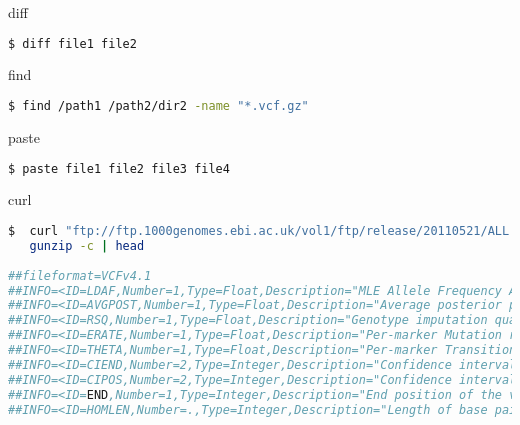\documentclass{beamer}
\begin{document}
\begin{frame}[fragile]
 \begin{center}
    \huge{diff}\\
    \end{center}
\begin{lstlisting}[language=bash]
$ diff file1 file2
\end{lstlisting}
\end{frame}

\begin{frame}[fragile]
 \begin{center}
    \huge{find}\\
    \end{center}
\begin{lstlisting}[language=bash]
$ find /path1 /path2/dir2 -name "*.vcf.gz"
\end{lstlisting}
\end{frame}

\begin{frame}[fragile]
 \begin{center}
    \huge{paste}\\
    \end{center}
\begin{lstlisting}[language=bash]
$ paste file1 file2 file3 file4
\end{lstlisting}
\end{frame}

\begin{frame}[fragile]
 \begin{center}
    \huge{curl}\\
    \end{center}
\begin{lstlisting}[language=bash,breaklines=true]
$  curl "ftp://ftp.1000genomes.ebi.ac.uk/vol1/ftp/release/20110521/ALL.wgs.phase1_release_v3.20101123.snps_indels_sv.sites.vcf.gz" |\
   gunzip -c | head
   
##fileformat=VCFv4.1
##INFO=<ID=LDAF,Number=1,Type=Float,Description="MLE Allele Frequency Accounting for LD">
##INFO=<ID=AVGPOST,Number=1,Type=Float,Description="Average posterior probability from MaCH/Thunder">
##INFO=<ID=RSQ,Number=1,Type=Float,Description="Genotype imputation quality from MaCH/Thunder">
##INFO=<ID=ERATE,Number=1,Type=Float,Description="Per-marker Mutation rate from MaCH/Thunder">
##INFO=<ID=THETA,Number=1,Type=Float,Description="Per-marker Transition rate from MaCH/Thunder">
##INFO=<ID=CIEND,Number=2,Type=Integer,Description="Confidence interval around END for imprecise variants">
##INFO=<ID=CIPOS,Number=2,Type=Integer,Description="Confidence interval around POS for imprecise variants">
##INFO=<ID=END,Number=1,Type=Integer,Description="End position of the variant described in this record">
##INFO=<ID=HOMLEN,Number=.,Type=Integer,Description="Length of base pair identical micro-homology at event breakpoints">
\end{lstlisting}
\end{frame}
\end{document}
